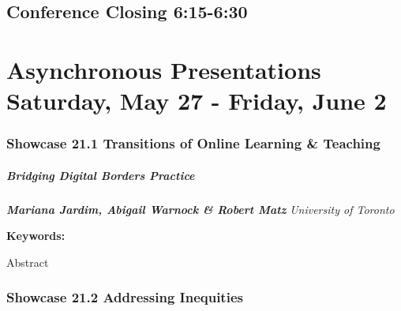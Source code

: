 \documentclass[
]{book}
\begin{document}
\hypertarget{conference-closing-615-630}{%
\section*{Conference Closing \textbar{} 6:15-6:30}\label{conference-closing-615-630}}

\hypertarget{asynchronous-presentations-saturday-may-27---friday-june-2}{%
\chapter*{Asynchronous Presentations \textbar{} Saturday, May 27 - Friday, June 2}\label{asynchronous-presentations-saturday-may-27---friday-june-2}}

\hypertarget{showcase-21.1-transitions-of-online-learning-teaching}{%
\subsection*{Showcase 21.1 \textbar{} Transitions of Online Learning \& Teaching}\label{showcase-21.1-transitions-of-online-learning-teaching}}

\begin{session}
\hypertarget{bridging-digital-borders-practice}{%
\paragraph*{\texorpdfstring{\textbf{Bridging Digital Borders} \textbar{}
Practice}{Bridging Digital Borders \textbar{} Practice}}\label{bridging-digital-borders-practice}}

\textbf{\emph{Mariana Jardim, Abigail Warnock \& Robert Matz}}
\textbar{} \emph{University of Toronto}

\textbf{Keywords:}

Abstract
\end{session}

\hypertarget{showcase-21.2-addressing-inequities}{%
\subsection*{Showcase 21.2 \textbar{} Addressing Inequities}\label{showcase-21.2-addressing-inequities}}
\end{document}
